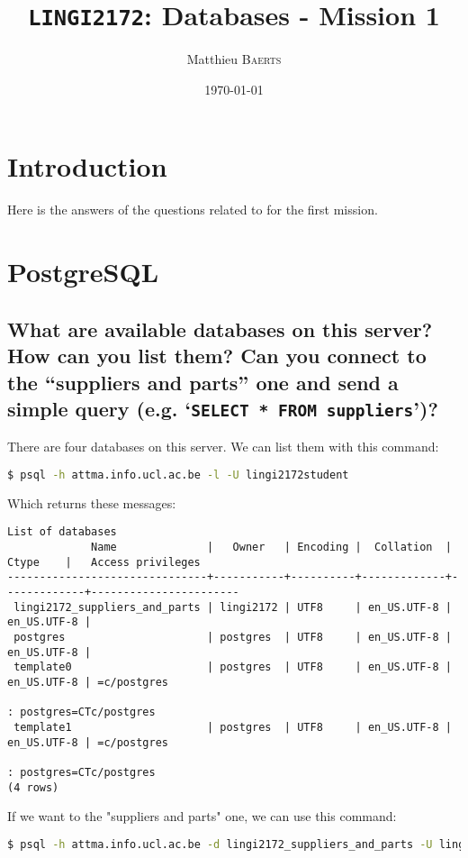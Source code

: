 \documentclass[a4paper,11pt]{article}
\title{\texttt{LINGI2172}: Databases - Mission 1}
\author{Matthieu \textsc{Baerts}}
\date{\today}
\begin{document}
\maketitle

\section*{Introduction}
Here is the answers of the questions related to for the first mission.

\section{PostgreSQL}

\subsection{What are available databases on this server? How can you list them? Can you connect to the “suppliers and parts” one and send a simple query (e.g. ‘\texttt{SELECT * FROM suppliers}’)?}

There are four databases on this server. We can list them with this command:
\begin{lstlisting}[language=bash]
	$ psql -h attma.info.ucl.ac.be -l -U lingi2172student
\end{lstlisting}
Which returns these messages:
\begin{lstlisting}[basicstyle=\ttfamily\tiny,flexiblecolumns=false]
                                            List of databases
             Name              |   Owner   | Encoding |  Collation  |    Ctype    |   Access privileges   
-------------------------------+-----------+----------+-------------+-------------+-----------------------
 lingi2172_suppliers_and_parts | lingi2172 | UTF8     | en_US.UTF-8 | en_US.UTF-8 | 
 postgres                      | postgres  | UTF8     | en_US.UTF-8 | en_US.UTF-8 | 
 template0                     | postgres  | UTF8     | en_US.UTF-8 | en_US.UTF-8 | =c/postgres
                                                                                  : postgres=CTc/postgres
 template1                     | postgres  | UTF8     | en_US.UTF-8 | en_US.UTF-8 | =c/postgres
                                                                                  : postgres=CTc/postgres
(4 rows)
\end{lstlisting}
If we want to the "suppliers and parts" one, we can use this command:\label{connect}
\begin{lstlisting}[language=bash]
	$ psql -h attma.info.ucl.ac.be -d lingi2172_suppliers_and_parts -U lingi2172student
\end{lstlisting}
\end{document}
